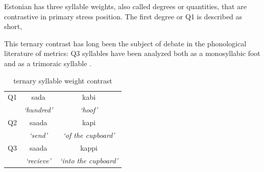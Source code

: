 Estonian has three syllable weights, also called degrees or quantities, that are contrastive in primary stress position. The first degree or Q1 is described as short, 

This ternary contrast has long been the subject of debate in the phonological literature of metrics: Q3 syllables have been analyzed both as a monosyllabic foot \citep{princeMetricalTheoryEstonian1980} and as a trimoraic syllable \citep{hayesCompensatoryLengtheningMoraic1989, kuznetsovaEstonianWordProsody2018,prillopMoraeEstonianReply2020}. 



%
%
%
 \begin{table}[htb]
\centering
\begin{tabular}{lcc}
\hline

Q1 &		 sada 		& 	kabi  \\  
	&	 {\it `hundred'} 	&	 {\it`hoof' }\\
\hline
Q2 &		saada 		&	kapi \\
	&	 {\it`send' }		&	{\it`of the cupboard' }		\\
\hline
Q3 &		saada 	&	 kappi 	\\
	&	{\it`recieve' }	&	{\it`into the cupboard' }	\\
\hline
\end{tabular}
\label{qexamps}
\caption{ternary syllable weight contrast}
\end{table}


 
  
